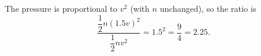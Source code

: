 The pressure is proportional to $v^2$ (with $n$ unchanged), so the ratio is
\[
\dfrac{\dfrac{1}{2}n(1.5v)^2}{\dfrac{1}{2}nv^2}=1.5^2=\boxed{\dfrac{9}{4}}=2.25 .
\]
